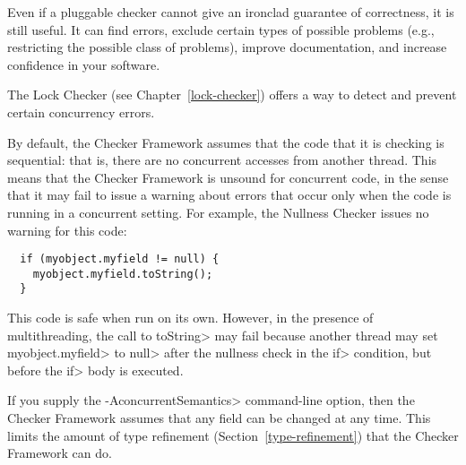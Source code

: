 
Even if a pluggable checker cannot give an ironclad
guarantee of correctness, it is still useful.  It can find errors,
exclude certain types of possible problems (e.g., restricting the
possible class of problems), improve documentation, and increase confidence
in your software.



The Lock Checker (see Chapter~\ref{lock-checker}) offers a way to detect
and prevent certain concurrency errors.


By default, the Checker Framework assumes that the code that it is checking
is sequential:  that is, there are no concurrent accesses from another
thread.  This means that the Checker Framework is unsound for concurrent
code, in the sense that it may fail to issue a warning about errors that
occur only when the code is running in a concurrent setting.
For example, the Nullness Checker issues no warning for this
code:

\begin{Verbatim}
  if (myobject.myfield != null) {
    myobject.myfield.toString();
  }
\end{Verbatim}

\noindent
This code is safe when run on its own.
However, in the presence of multithreading, the call to \<toString> may
fail because another thread may set \<myobject.myfield> to \<null> after
the nullness check in the \<if> condition, but before the \<if> body is
executed.

If you supply the \<-AconcurrentSemantics> command-line option, then the
Checker Framework assumes that any field can be changed at any time.  This
limits the amount of type refinement
(Section~\ref{type-refinement}) that the Checker Framework can do.


%
%
%
%
%
%
%


